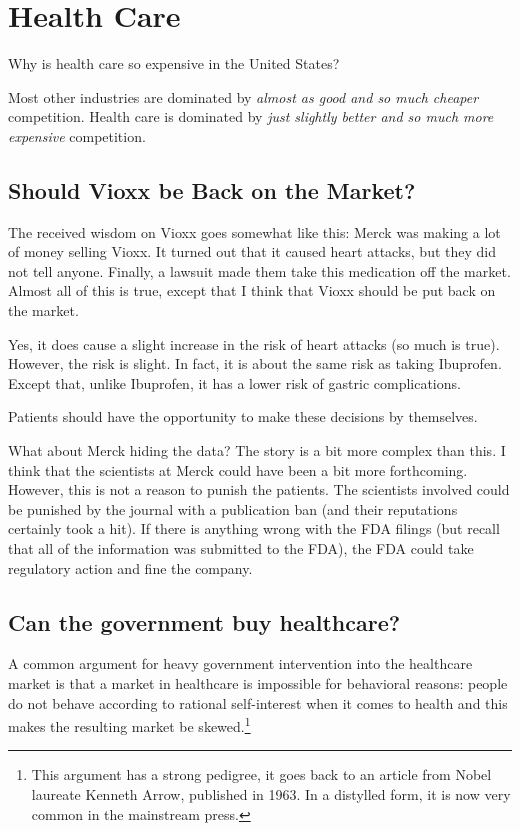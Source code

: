 \chapter{Health Care}
\label{chpt:health}

Why is health care so expensive in the United States?

Most other industries are dominated by \emph{almost as good and so much
cheaper} competition. Health care is dominated by \emph{just slightly better
and so much more expensive} competition.

\section{Should Vioxx be Back on the Market?}

The received wisdom on Vioxx goes somewhat like this: Merck was making a lot of
money selling Vioxx. It turned out that it caused heart attacks, but they did
not tell anyone. Finally, a lawsuit made them take this medication off the
market. Almost all of this is true, except that I think that Vioxx should be
put back on the market.

Yes, it does cause a slight increase in the risk of heart attacks (so much is
true). However, the risk is slight. In fact, it is about the same risk as
taking Ibuprofen. Except that, unlike Ibuprofen, it has a lower risk of gastric
complications.

Patients should have the opportunity to make these decisions by themselves.

What about Merck hiding the data? The story is a bit more complex than this. I
think that the scientists at Merck could have been a bit more forthcoming.
However, this is not a reason to punish the patients. The scientists involved
could be punished by the journal with a publication ban (and their reputations
certainly took a hit). If there is anything wrong with the FDA filings (but
recall that all of the information was submitted to the FDA), the FDA could
take regulatory action and fine the company.

\section{Can the government buy healthcare?}

A common argument for heavy government intervention into the healthcare market
is that a market in healthcare is impossible for behavioral reasons: people do
not behave according to rational self-interest when it comes to health and this
makes the resulting market be skewed.\footnote{This argument has a strong
pedigree, it goes back to an article from Nobel laureate Kenneth Arrow,
published in 1963. In a distylled form, it is now very common in the mainstream
press.}

